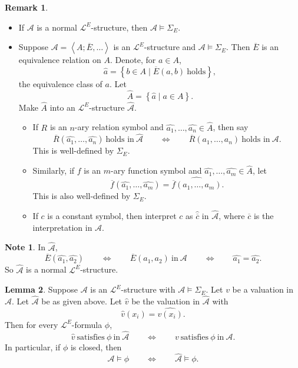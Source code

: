 \documentclass{article}
\newcommand{\A}{\mathcal{A}}
\renewcommand{\L}{\mathcal{L}}
\newcommand{\rb}[1]{\left( #1 \right)}
\newcommand{\cb}[1]{\left\{ #1 \right\}}
\newcommand{\ab}[1]{\left\langle #1 \right\rangle}
\theoremstyle{definition}\newtheorem{definition}{Definition}[subsection]
\theoremstyle{definition}\newtheorem{remark1}[definition]{Remark}
\theoremstyle{definition}\newtheorem{example1}[definition]{Example}
\theoremstyle{definition}\newtheorem*{remark2}{Remark}
\theoremstyle{definition}\newtheorem*{example2}{Example}
\theoremstyle{definition}\newtheorem*{note}{Note}
\theoremstyle{definition}\newtheorem*{notation}{Notation}
\newtheorem{lemma}[definition]{Lemma}
\begin{document}
\begin{remark1}
\hfill
\begin{itemize}
\item If $ \A $ is a normal $ \L^E $-structure, then $ \A \vDash \Sigma_E $.
\item Suppose $ \A = \ab{A; \overline{E}, \dots} $ is an $ \L^E $-structure and $ \A \vDash \Sigma_E $. Then $ \overline{E} $ is an equivalence relation on $ A $. Denote, for $ a \in A $,
$$ \widehat{a} = \cb{b \in A \mid \overline{E}\rb{a, b} \ \text{holds}}, $$
the equivalence class of $ a $. Let
$$ \widehat{A} = \cb{\widehat{a} \mid a \in A}. $$
Make $ \widehat{A} $ into an $ \L^E $-structure $ \widehat{\A} $.
\begin{itemize}
\item If $ R $ is an $ n $-ary relation symbol and $ \widehat{a_1}, \dots, \widehat{a_n} \in \widehat{A} $, then say
$$ \overline{R}\rb{\widehat{a_1}, \dots, \widehat{a_n}} \ \text{holds in} \ \widehat{\A} \qquad \iff \qquad \overline{R}\rb{a_1, \dots, a_n} \ \text{holds in} \ \A. $$
This is well-defined by $ \Sigma_E $.
\item Similarly, if $ f $ is an $ m $-ary function symbol and $ \widehat{a_1}, \dots, \widehat{a_m} \in \widehat{A} $, let
$$ \overline{f}\rb{\widehat{a_1}, \dots, \widehat{a_m}} = \widehat{\overline{f}\rb{a_1, \dots, a_m}}. $$
This is also well-defined by $ \Sigma_E $.
\item If $ c $ is a constant symbol, then interpret $ c $ as $ \widehat{\overline{c}} $ in $ \widehat{\A} $, where $ \overline{c} $ is the interpretation in $ \A $.
\end{itemize}
\end{itemize}
\end{remark1}

\begin{note}
In $ \widehat{\A} $,
$$ \overline{E}\rb{\widehat{a_1}, \widehat{a_2}} \qquad \iff \qquad \overline{E}\rb{a_1, a_2} \ \text{in} \ \A \qquad \iff \qquad \widehat{a_1} = \widehat{a_2}. $$
So $ \widehat{\A} $ is a normal $ \L^E $-structure.
\end{note}

\begin{lemma}
\label{lem:2.6.3}
Suppose $ \A $ is an $ \L^E $-structure with $ \A \vDash \Sigma_E $. Let $ v $ be a valuation in $ \A $. Let $ \widehat{\A} $ be as given above. Let $ \widehat{v} $ be the valuation in $ \widehat{\A} $ with
$$ \widehat{v}\rb{x_i} = \widehat{v\rb{x_i}}. $$
Then for every $ \L^E $-formula $ \phi $,
$$ \widehat{v} \ \text{satisfies} \ \phi \ \text{in} \ \widehat{\A} \qquad \iff \qquad v \ \text{satisfies} \ \phi \ \text{in} \ \A. $$
In particular, if $ \phi $ is closed, then
$$ \A \vDash \phi \qquad \iff \qquad \widehat{\A} \vDash \phi. $$
\end{lemma}
\end{document}
